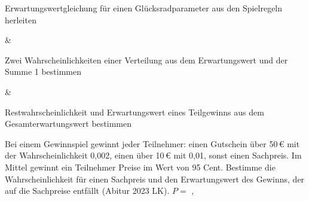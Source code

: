 \begin{aufgabe}{Erwartungswertgleichung für einen Glücksradparameter aus den Spielregeln herleiten}
\begin{gleichungsraster}[2]
 & \\
\end{gleichungsraster}
\end{aufgabe}

\begin{aufgabe}{Zwei Wahrscheinlichkeiten einer Verteilung aus dem Erwartungswert und der Summe 1 bestimmen}
\begin{gleichungsraster}[2]
 & \\
\end{gleichungsraster}
\end{aufgabe}

\begin{aufgabe}{Restwahrscheinlichkeit und Erwartungswert eines Teilgewinns aus dem Gesamterwartungswert bestimmen}
\begin{teile}
\teil Bei einem Gewinnspiel gewinnt jeder Teilnehmer: einen Gutschein über 50\,€ mit der Wahrscheinlichkeit 0{,}002, einen über 10\,€ mit 0{,}01, sonst einen Sachpreis. Im Mittel gewinnt ein Teilnehmer Preise im Wert von 95 Cent. Bestimme die Wahrscheinlichkeit für einen Sachpreis und den Erwartungswert des Gewinns, der auf die Sachpreise entfällt \hfill (Abitur 2023 LK). $P = $ \leerfeld , \leerfeld[€]
\end{teile}
\end{aufgabe}


